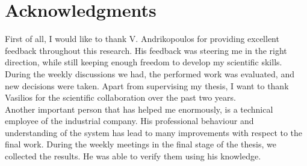 



\bigskip

\begingroup
\let\clearpage\relax
\let\cleardoublepage\relax
\let\cleardoublepage\relax
\chapter*{Acknowledgments}
First of all, I would like to thank V. Andrikopoulos for providing excellent feedback throughout this research. His feedback was steering me in the right direction, while still keeping enough freedom to develop my scientific skills. During the weekly discussions we had, the performed work was evaluated, and new decisions were taken. Apart from supervising my thesis, I want to thank Vasilios for the scientific collaboration over the past two years.\\

\noindent
Another important person that has helped me enormously, is a technical employee of the industrial company. His professional behaviour and understanding of the system has lead to many improvements with respect to the final work. During the weekly meetings in the final stage of the thesis, we collected the results. He was able to verify them using his knowledge.


\endgroup
